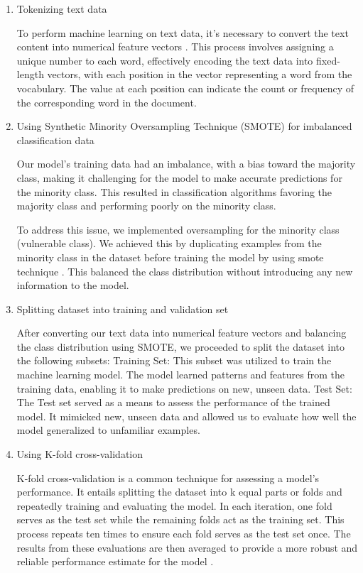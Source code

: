 \documentclass[journal,a4paper]{IEEEtran}
\begin{document}
\begin{enumerate}
\item Tokenizing text data

To perform machine learning on text data, it's necessary to convert the text content into numerical feature vectors \cite{Text_Data}. This process involves assigning a unique number to each word, effectively encoding the text data into fixed-length vectors, with each position in the vector representing a word from the vocabulary. The value at each position can indicate the count or frequency of the corresponding word in the document.

\item Using Synthetic Minority Oversampling Technique (SMOTE) for imbalanced classification data

Our model's training data had an imbalance, with a bias toward the majority class, making it challenging for the model to make accurate predictions for the minority class. This resulted in classification algorithms favoring the majority class and performing poorly on the minority class.

To address this issue, we implemented oversampling for the minority class (vulnerable class). We achieved this by duplicating examples from the minority class in the dataset before training the model by using smote technique  \cite{chawla2002smote}. This balanced the class distribution without introducing any new information to the model.

\item Splitting dataset into training and validation set

After converting our text data into numerical feature vectors and balancing the class distribution using SMOTE, we proceeded to split the dataset into the following subsets:
Training Set: This subset was utilized to train the machine learning model. The model learned patterns and features from the training data, enabling it to make predictions on new, unseen data.
Test Set: The Test set served as a means to assess the performance of the trained model. It mimicked new, unseen data and allowed us to evaluate how well the model generalized to unfamiliar examples.

\item Using K-fold cross-validation

K-fold cross-validation is a common technique for assessing a model's performance. It entails splitting the dataset into k equal parts or folds and repeatedly training and evaluating the model. In each iteration, one fold serves as the test set while the remaining folds act as the training set. This process repeats ten times to ensure each fold serves as the test set once. The results from these evaluations are then averaged to provide a more robust and reliable performance estimate for the model \cite{inbook_Cross_Validation}.


\end{enumerate}
\end{document}
